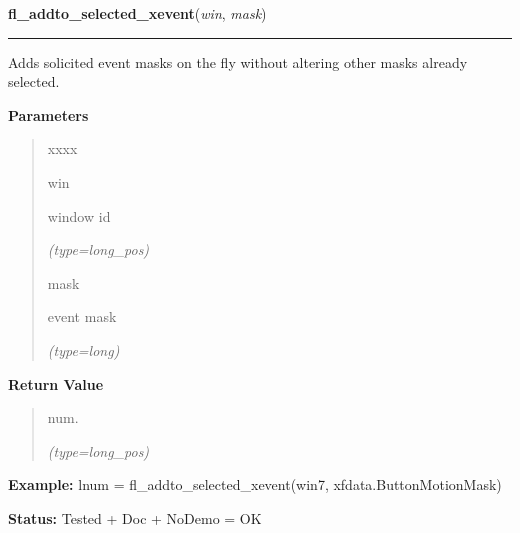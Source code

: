 \hspace{.8\funcindent}\begin{boxedminipage}{\funcwidth}

    \raggedright \textbf{fl\_addto\_selected\_xevent}(\textit{win}, \textit{mask})

    \vspace{-1.5ex}

    \rule{\textwidth}{0.5\fboxrule}
\setlength{\parskip}{2ex}
    Adds solicited event masks on the fly without altering other masks 
    already selected.

\setlength{\parskip}{1ex}
      \textbf{Parameters}
      \vspace{-1ex}

      \begin{quote}
        \begin{Ventry}{xxxx}

          \item[win]

          window id

            {\it (type=long\_pos)}

          \item[mask]

          event mask

            {\it (type=long)}

        \end{Ventry}

      \end{quote}

      \textbf{Return Value}
    \vspace{-1ex}

      \begin{quote}
      num.

      {\it (type=long\_pos)}

      \end{quote}

\textbf{Example:} lnum = fl\_addto\_selected\_xevent(win7, xfdata.ButtonMotionMask)



\textbf{Status:} Tested + Doc + NoDemo = OK



    \end{boxedminipage}

    \label{xformslib:flxbasic:fl_remove_selected_xevent}

